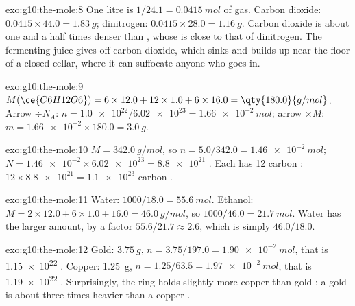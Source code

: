 \begin{solution}{exo:g10:the-mole:8}
One litre is $1/24.1 = \qty{0.0415}{mol}$ of gas. Carbon dioxide:
$0.0415 \times 44.0 = \qty{1.83}{g}$; dinitrogen:
$0.0415 \times 28.0 = \qty{1.16}{g}$. Carbon dioxide is about one and a
half times denser than , whose  is close to that of
dinitrogen. The fermenting juice gives off carbon dioxide, which sinks
and builds up near the floor of a closed cellar, where it can suffocate
anyone who goes in.
\end{solution}

\begin{solution}{exo:g10:the-mole:9}
$M(\ce{C6H12O6}) = 6 \times 12.0 + 12 \times 1.0 + 6 \times 16.0 =
\qty{180.0}{g/mol}$. Arrow $\div N_A$: $n = \num{1.0e22} / \num{6.02e23} =
\qty{1.66e-2}{mol}$; arrow $\times M$: $m = \num{1.66e-2} \times 180.0 =
\qty{3.0}{g}$.
\end{solution}

\begin{solution}{exo:g10:the-mole:10}
$M = \qty{342.0}{g/mol}$, so $n = 5.0 / 342.0 = \qty{1.46e-2}{mol}$;
$N = \num{1.46e-2} \times \num{6.02e23} = \num{8.8e21}$ . Each
has 12 carbon : $12 \times \num{8.8e21} = \num{1.1e23}$ carbon .
\end{solution}

\begin{solution}{exo:g10:the-mole:11}
Water: $1000 / 18.0 = \qty{55.6}{mol}$. Ethanol:
$M = 2 \times 12.0 + 6 \times 1.0 + 16.0 = \qty{46.0}{g/mol}$, so
$1000 / 46.0 = \qty{21.7}{mol}$. Water has the larger amount, by a
factor $55.6 / 21.7 \approx 2.6$, which is simply $46.0 / 18.0$.
\end{solution}

\begin{solution}{exo:g10:the-mole:12}
Gold: $\qty{3.75}{g}$, $n = 3.75 / 197.0 = \qty{1.90e-2}{mol}$, that is
\num{1.15e22} . Copper: \qty{1.25}{g},
$n = 1.25 / 63.5 = \qty{1.97e-2}{mol}$, that is \num{1.19e22} .
Surprisingly, the ring holds slightly more copper  than gold :
a gold  is about three times heavier than a copper .
\end{solution}

